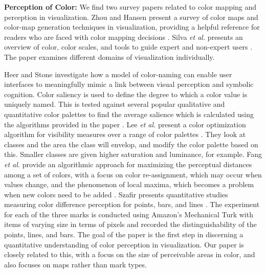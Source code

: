 \textbf{Perception of Color: }
We find two survey papers related to color mapping and perception in visualization. Zhou and Hansen present a survey of color maps and color-map generation techniques in visualization, providing a helpful reference for readers who are faced with color mapping decisions \cite{zhou2015survey}. Silva \textit{et al.} presents an overview of color, color scales, and tools to guide expert and non-expert users \cite{silva2011using}. The paper examines different domains of visualization individually.

Heer and Stone investigate how a model of color-naming can enable user interfaces to meaningfully mimic a link between visual perception and symbolic cognition. Color saliency is used to define the degree to which a color value is uniquely named. This is tested against several popular qualitative and quantitative color palettes to find the average salience which is calculated using the algorithms provided in the paper \cite{heer2012color}. Lee \textit{et al.} present a color optimization algorithm for visibility measures over a range of color palettes \cite{lee2013perceptually}. They look at classes and the area the class will envelop, and modify the color palette based on this. Smaller classes are given higher saturation and luminance, for example. Fang \textit{et al.} provide an algorithmic approach for maximizing the perceptual distances among a set of colors, with a focus on color re-assignment, which may occur when values change, and the phenomenon of local maxima, which becomes a problem when new colors need to be added \cite{fang2017categorical}. Szafir presents quantitative studies measuring color difference perception for points, bars, and lines \cite{szafir2018modeling}. The experiment for each of the three marks is conducted using Amazon's Mechanical Turk with items of varying size in terms of pixels and recorded the distinguishability of the points, lines, and bars. The goal of the paper is the first step in discerning a quantitative understanding of color perception in visualization. Our paper is closely related to this, with a focus on the size of perceivable areas in color, and also focuses on maps rather than mark types.


